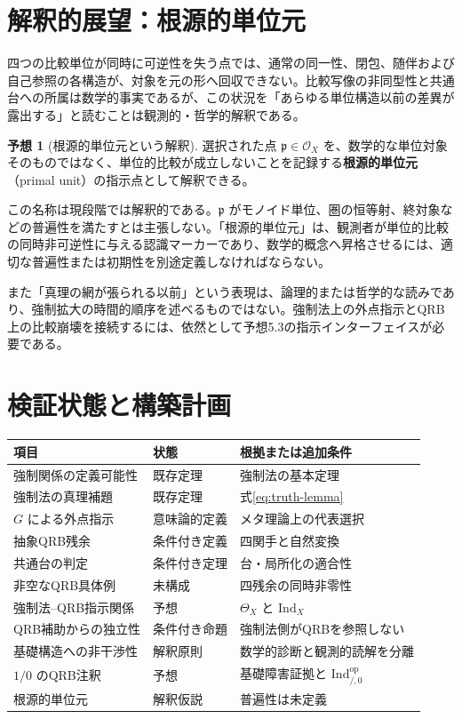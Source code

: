 \documentclass[a4paper,11pt]{ltjsarticle}
\theoremstyle{definition}
\newtheorem{conjecture}[definition]{予想}
\theoremstyle{plain}
\newcommand{\Ind}{\mathrm{Ind}}
\begin{document}
\section{解釈的展望：根源的単位元}

四つの比較単位が同時に可逆性を失う点では、通常の同一性、閉包、随伴および自己参照の各構造が、対象を元の形へ回収できない。比較写像の非同型性と共通台への所属は数学的事実であるが、この状況を「あらゆる単位構造以前の差異が露出する」と読むことは観測的・哲学的解釈である。

\begin{conjecture}[根源的単位元という解釈]
選択された点 $\mathfrak p\in\mathcal O_X$ を、数学的な単位対象そのものではなく、単位的比較が成立しないことを記録する\textbf{根源的単位元}（primal unit）の指示点として解釈できる。
\end{conjecture}

この名称は現段階では解釈的である。$\mathfrak p$ がモノイド単位、圏の恒等射、終対象などの普遍性を満たすとは主張しない。「根源的単位元」は、観測者が単位的比較の同時非可逆性に与える認識マーカーであり、数学的概念へ昇格させるには、適切な普遍性または初期性を別途定義しなければならない。

また「真理の網が張られる以前」という表現は、論理的または哲学的な読みであり、強制拡大の時間的順序を述べるものではない。強制法上の外点指示とQRB上の比較崩壊を接続するには、依然として予想5.3の指示インターフェイスが必要である。

\section{検証状態と構築計画}

\begin{center}
\begin{tabular}{p{} p{} p{}}
\toprule
項目 & 状態 & 根拠または追加条件 \\
\midrule
強制関係の定義可能性 & 既存定理 & 強制法の基本定理 \\
強制法の真理補題 & 既存定理 & 式\eqref{eq:truth-lemma} \\
$G$ による外点指示 & 意味論的定義 & メタ理論上の代表選択 \\
抽象QRB残余 & 条件付き定義 & 四関手と自然変換 \\
共通台の判定 & 条件付き定理 & 台・局所化の適合性 \\
非空なQRB具体例 & 未構成 & 四残余の同時非零性 \\
強制法--QRB指示関係 & 予想 & $\Theta_X$ と $\Ind_X$ \\
QRB補助からの独立性 & 条件付き命題 & 強制法側がQRBを参照しない \\
基礎構造への非干渉性 & 解釈原則 & 数学的診断と観測的読解を分離 \\
$1/0$ のQRB注釈 & 予想 & 基礎障害証拠と $\Ind^{\mathrm{op}}_{/,0}$ \\
根源的単位元 & 解釈仮説 & 普遍性は未定義 \\
\bottomrule
\end{tabular}
\end{center}
\end{document}
